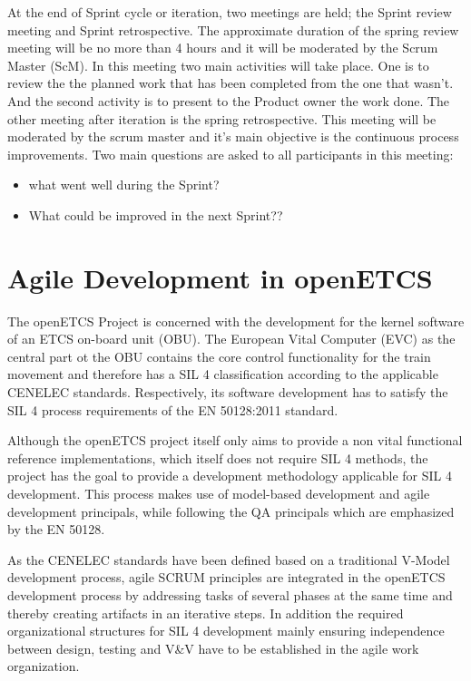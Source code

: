 At the end of Sprint cycle or iteration, two meetings are held; the Sprint review meeting and Sprint retrospective. The approximate duration of the spring review meeting will be no more than 4 hours and it will be moderated by the Scrum Master (ScM). In this meeting two main activities will take place. One is to review the the planned work that has been completed from the one that wasn't. And the second activity is to present to the Product owner the work done. The other meeting after iteration is the spring retrospective. This meeting will be moderated by the scrum master and it's main objective is the continuous process improvements. Two main questions are asked to all participants in this meeting:
\begin{itemize}
\item   what went well during the Sprint? 
\item What could be improved in the next Sprint?? 
\end{itemize}


\chapter{Agile Development in openETCS}
\label{sec:agile}

The openETCS Project is concerned with the development for the kernel software of an ETCS on-board unit (OBU). The European Vital Computer (EVC) as the central part ot the OBU contains the core control functionality for the train movement and therefore has a SIL 4 classification according to the applicable CENELEC standards. Respectively, its software development has to satisfy the SIL 4 process requirements of the EN 50128:2011 standard. 

Although the openETCS project itself only aims to provide a non vital functional reference implementations, which itself does not require SIL 4 methods, the project has the goal to provide a development methodology applicable for SIL 4 development. This process makes use of model-based development and agile development principals, while following the QA principals which are emphasized by the EN 50128. 

As the CENELEC standards have been defined based on a traditional V-Model development process, agile SCRUM principles are integrated in the openETCS development process by addressing tasks of several phases at the same time and thereby creating artifacts in an iterative steps. In addition the required organizational structures for SIL 4 development mainly ensuring independence between design, testing and V\&V have to be established in the agile work organization.

